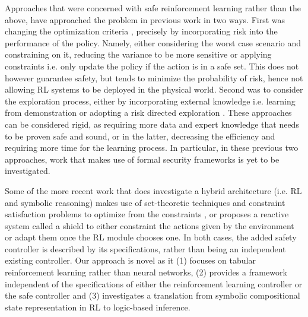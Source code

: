 \documentclass[a4paper,11pt]{article}
\begin{document}
Approaches that were concerned with safe reinforcement learning rather than the above, have approached the problem in previous work \cite{Garca2015ACS} in two ways. First was changing the optimization criteria \cite{rockafellar2000}, precisely by incorporating risk into the performance of the policy.
Namely, either considering the worst case scenario and constraining on it, reducing the variance to be more sensitive or applying constraints i.e. only update the policy if the action is in a safe set. 
This does not however guarantee safety, but tends to minimize the probability of risk, hence not allowing RL systems to be deployed in the physical world. 
Second was to consider the exploration process, either by incorporating external knowledge i.e. learning from demonstration \cite{Siebel2007EvolutionaryRL} or adopting a risk directed exploration \cite{law2005}. These approaches can be considered rigid, 
as requiring more data and expert knowledge that needs to be proven safe and sound, or in the latter, decreasing the efficiency and requiring more time for the learning process. 
In particular, in these previous two approaches, work that makes use of formal security frameworks is yet to be investigated. 

\medskip

Some of the more recent work that does investigate a hybrid architecture (i.e. RL and symbolic reasoning) makes use of
set-theoretic techniques and constraint satisfaction problems to optimize from the constraints \cite{Li2021SafeRL}, or proposes a reactive system called a shield \cite{alshiekh2017} to either constraint the actions given by the environment or adapt them once the RL module chooses one. 
In both cases, the added safety controller is described by its specifications, rather than being an independent existing controller. 
\newline 
Our approach is novel as it (1) focuses on tabular reinforcement learning rather than neural networks, (2) provides a framework independent of the specifications of either 
the reinforcement learning controller or the safe controller and (3) investigates a translation from  
symbolic compositional state representation in RL to logic-based inference. 


\newpage



\end{document}
